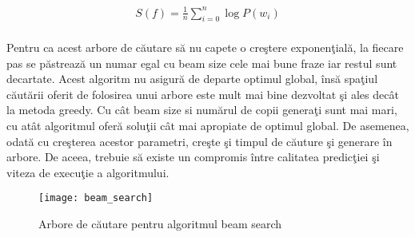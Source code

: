 \begin{equation}
\begin{split}
S(f) = \frac{1}{n} \sum_{i=0}^{n} \log P(w_{i})
\end{split}
\end{equation}

\paragraph{}
Pentru ca acest arbore de c\u autare s\u a nu capete o cre\c stere exponen\c tial\u a, la fiecare pas se p\u astreaz\u a un numar egal cu beam size cele mai bune fraze iar restul sunt decartate. Acest algoritm nu asigur\u a de departe optimul global, \^ ins\u a spa\c tiul c\u aut\u arii oferit de folosirea unui arbore este mult mai bine dezvoltat \c si ales dec\^ at la metoda greedy. Cu c\^ at beam size si num\u arul de copii genera\c ti sunt mai mari, cu at\^ at algoritmul ofer\u a solu\c tii c\^ at mai apropiate de optimul global. De asemenea, odat\u a cu cre\c sterea acestor parametri, cre\c ste \c si timpul de c\u auture \c si generare \^ in arbore. De aceea, trebuie s\u a existe un compromis \^ intre calitatea predic\c tiei \c si viteza de execu\c tie a algoritmului.

\begin{figure}[H]
\centering
\texttt{[image: beam\_search]}
\caption{Arbore de c\u autare pentru algoritmul beam search}
\end{figure} 